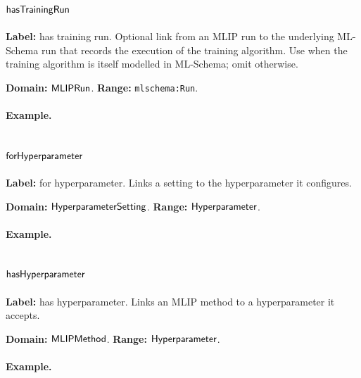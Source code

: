 \subsection{$\mathsf{hasTrainingRun}$}
\label{sec:term-hasTrainingRun}

\textbf{Label:} has training run.
Optional link from an MLIP run to the underlying ML-Schema run that records the execution of the training algorithm. Use when the training algorithm is itself modelled in ML-Schema; omit otherwise.

\textbf{Domain:} $\mathsf{MLIPRun}$.
\textbf{Range:} \texttt{mlschema:Run}.

\paragraph{Example.}

\subsection{$\mathsf{forHyperparameter}$}
\label{sec:term-forHyperparameter}

\textbf{Label:} for hyperparameter.
Links a setting to the hyperparameter it configures.

\textbf{Domain:} $\mathsf{HyperparameterSetting}$.
\textbf{Range:} $\mathsf{Hyperparameter}$.

\paragraph{Example.}

\subsection{$\mathsf{hasHyperparameter}$}
\label{sec:term-hasHyperparameter}

\textbf{Label:} has hyperparameter.
Links an MLIP method to a hyperparameter it accepts.

\textbf{Domain:} $\mathsf{MLIPMethod}$.
\textbf{Range:} $\mathsf{Hyperparameter}$.

\paragraph{Example.}

